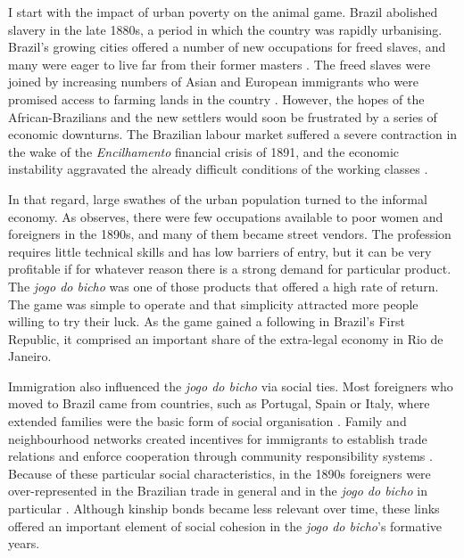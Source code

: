 \documentclass[a4paper,12pt]{article}
\begin{document}
I start with the impact of urban poverty on the animal game. Brazil abolished slavery in the late 1880s, a period in which the country was rapidly urbanising. Brazil's growing cities offered a number of new occupations for freed slaves, and many were eager to live far from their former masters \citep{andrews1991blacks, skidmore1993black}. The freed slaves were joined by increasing numbers of Asian and European immigrants who were promised access to farming lands in the country \citep{hall1969origins, lesser2013immigration}. However, the hopes of the African-Brazilians and the new settlers would soon be frustrated by a series of economic downturns. The Brazilian labour market suffered a severe contraction in the wake of the \textit{Encilhamento} financial crisis of 1891, and the economic instability aggravated the already difficult conditions of the working classes \citep{topik2014political, triner2005baring}.

In that regard, large swathes of the urban population turned to the informal economy. As \citet[115]{chazkel2011laws} observes, there were few occupations available to poor women and foreigners in the 1890s, and many of them became street vendors. The profession requires little technical skills and has low barriers of entry, but it can be very profitable if for whatever reason there is a strong demand for particular product. The \textit{jogo do bicho} was one of those products that offered a high rate of return. The game was simple to operate and that simplicity attracted more people willing to try their luck. As the game gained a following in Brazil's First Republic, it comprised an important share of the extra-legal economy in Rio de Janeiro.

Immigration also influenced the \textit{jogo do bicho} via social ties. Most foreigners who moved to Brazil came from countries, such as Portugal, Spain or Italy, where extended families were the basic form of social organisation \citep{lobo2001imigraccao, trento1989outro}. Family and neighbourhood networks created incentives for immigrants to establish trade relations and enforce cooperation through community responsibility systems \citep{roth2014prison}. Because of these particular social characteristics, in the 1890s foreigners were over-represented in the Brazilian trade in general \citep{mattos1991vadios, oliveira2001brasil} and in the \textit{jogo do bicho} in particular \citep{magalhaes2005ganhou, villar2008contravencao}. Although kinship bonds became less relevant over time, these links offered an important element of social cohesion in the \textit{jogo do bicho}'s formative years.
\end{document}
